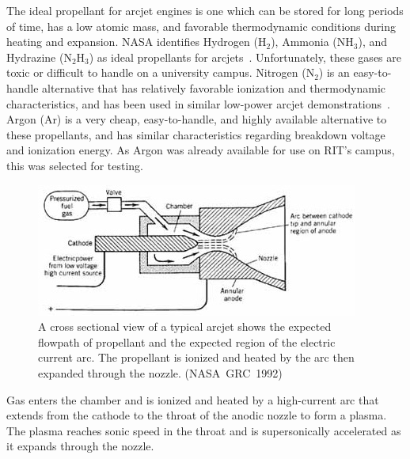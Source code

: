 \documentclass[journal]{IEEEtran}
\begin{document}
The ideal propellant for arcjet engines is one which can be stored for long periods of time, has a low atomic mass, and favorable thermodynamic conditions during heating and expansion.
NASA identifies Hydrogen (H$_{2}$), Ammonia (NH$_{3}$), and Hydrazine (N$_{2}$H$_{3}$) as ideal propellants for arcjets~\cite{nasa1992considerations}.
Unfortunately, these gases are toxic or difficult to handle on a university campus.
Nitrogen (N$_{2}$) is an easy-to-handle alternative that has relatively favorable ionization and thermodynamic characteristics, and has been used in similar low-power arcjet demonstrations~\cite{olin2012report,olin2012sim}.
Argon (Ar) is a very cheap, easy-to-handle, and highly available alternative to these propellants, and has similar characteristics regarding breakdown voltage and ionization energy. As Argon was already available for use on RIT's campus, this was selected for testing.
\begin{figure}[htp]
  \centering
  \includegraphics[width=\linewidth]{figs/cross-section_nasa}
  \caption[Arcjet cross-section]{A cross sectional view of a typical arcjet shows the expected flowpath of propellant and the expected region of the electric current arc. The propellant is ionized and heated by the arc then expanded through the nozzle. (NASA~GRC~1992)
\label{fig:x-section-nasa}
}
\end{figure}

Gas enters the chamber and is ionized and heated by a high-current arc that extends from the cathode to the throat of the anodic nozzle to form a plasma.
The plasma reaches sonic speed in the throat and is supersonically accelerated as it expands through the nozzle.
\end{document}
